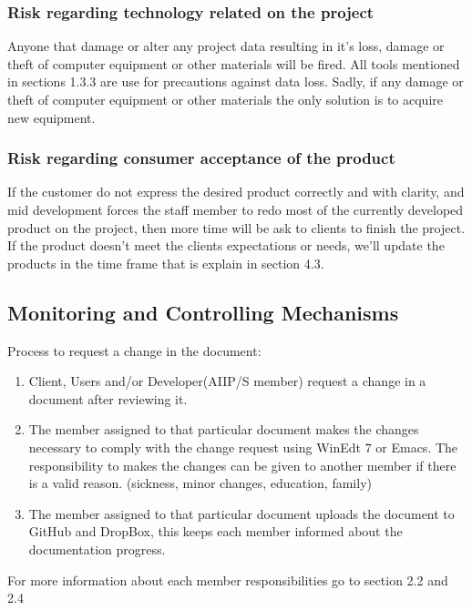 \documentclass[12pt]{article}
\begin{document}
\subsubsection{Risk regarding technology related on the project}
Anyone that damage or alter any project data resulting in it’s loss, damage or theft of computer equipment or other materials will be fired. All tools mentioned in sections 1.3.3 are use for precautions against data loss. Sadly, if any damage or theft of computer equipment or other materials the only solution is to acquire new equipment.   
\subsubsection{Risk regarding consumer acceptance of the product}
If the customer do not express the desired product correctly and with clarity, and mid development forces the staff member to redo most of the currently developed product on the project, then more time will be ask to clients to finish the project. If the product doesn’t meet the clients expectations or needs, we'll update the products in the time frame that is explain in section 4.3.

\subsection{Monitoring and Controlling Mechanisms}
Process to request a change in the document:
\begin{enumerate}
  \item Client, Users and/or Developer(AIIP/S member) request a change in a document after reviewing it.
  \item The member assigned to that particular document makes the changes necessary to comply with the change request using WinEdt 7 or Emacs. The responsibility to makes the changes can be given to another member if there is a valid reason. (sickness, minor changes, education, family)
  \item The member assigned to that particular document uploads the document to GitHub and DropBox, this keeps each member informed about the documentation progress.
\end{enumerate}
For more information about each member responsibilities go to section 2.2 and 2.4
\end{document}
